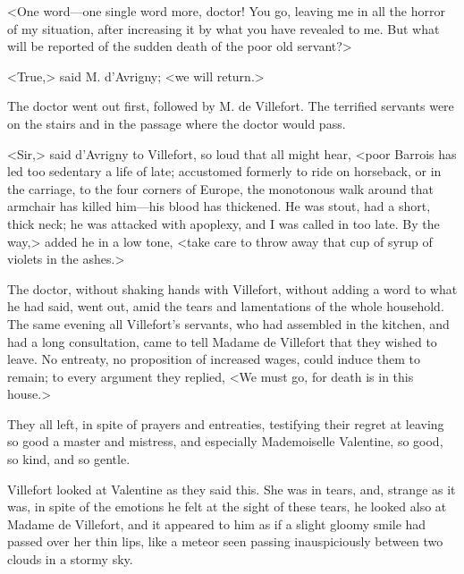  <One word—one single word more, doctor! You go, leaving me in all the horror of my situation, after increasing it by what you have revealed to me. But what will be reported of the sudden death of the poor old servant?> 

 <True,> said M. d'Avrigny; <we will return.> 

 The doctor went out first, followed by M. de Villefort. The terrified servants were on the stairs and in the passage where the doctor would pass. 

 <Sir,> said d'Avrigny to Villefort, so loud that all might hear, <poor Barrois has led too sedentary a life of late; accustomed formerly to ride on horseback, or in the carriage, to the four corners of Europe, the monotonous walk around that armchair has killed him—his blood has thickened. He was stout, had a short, thick neck; he was attacked with apoplexy, and I was called in too late. By the way,> added he in a low tone, <take care to throw away that cup of syrup of violets in the ashes.> 

 The doctor, without shaking hands with Villefort, without adding a word to what he had said, went out, amid the tears and lamentations of the whole household. The same evening all Villefort's servants, who had assembled in the kitchen, and had a long consultation, came to tell Madame de Villefort that they wished to leave. No entreaty, no proposition of increased wages, could induce them to remain; to every argument they replied, <We must go, for death is in this house.> 

 They all left, in spite of prayers and entreaties, testifying their regret at leaving so good a master and mistress, and especially Mademoiselle Valentine, so good, so kind, and so gentle. 

 Villefort looked at Valentine as they said this. She was in tears, and, strange as it was, in spite of the emotions he felt at the sight of these tears, he looked also at Madame de Villefort, and it appeared to him as if a slight gloomy smile had passed over her thin lips, like a meteor seen passing inauspiciously between two clouds in a stormy sky. 